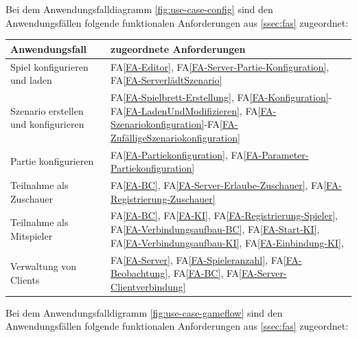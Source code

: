 \documentclass[12pt]{article}
\newcounter{fa}
\newcommand{\mfaref}[1]{FA\ref{#1}}
\begin{document}
Bei dem Anwendungsfalldiagramm \autoref{fig:use-case-config} sind den Anwendungsfällen folgende funktionalen Anforderungen aus \autoref{ssec:fas} zugeordnet: 

\vspace{0.5cm}

\begin{tabularx}{\linewidth}{l|X}
	\textbf{Anwendungsfall} & \textbf{zugeordnete Anforderungen} \\
	\hline
	Spiel konfigurieren und laden & \mfaref{FA-Editor}, \mfaref{FA-Server-Partie-Konfiguration}, \mfaref{FA-ServerlädtSzenario} \\
	Szenario erstellen und konfigurieren & \mfaref{FA-Spielbrett-Erstellung}, \mfaref{FA-Konfiguration}-\mfaref{FA-LadenUndModifizieren}, \mfaref{FA-Szenariokonfiguration}-\mfaref{FA-ZufälligeSzenariokonfiguration} \\
	Partie konfigurieren & \mfaref{FA-Partiekonfiguration}, \mfaref{FA-Parameter-Partiekonfiguration} \\
	Teilnahme als Zuschauer & \mfaref{FA-BC}, \mfaref{FA-Server-Erlaube-Zuschauer}, \mfaref{FA-Registrierung-Zuschauer} \\
	Teilnahme als Mitspieler & \mfaref{FA-BC}, \mfaref{FA-KI}, \mfaref{FA-Registrierung-Spieler}, \mfaref{FA-Verbindungsaufbau-BC}, \mfaref{FA-Start-KI}, \mfaref{FA-Verbindungsaufbau-KI}, \mfaref{FA-Einbindung-KI}, \\
	Verwaltung von Clients & \mfaref{FA-Server}, \mfaref{FA-Spieleranzahl}, \mfaref{FA-Beobachtung}, \mfaref{FA-BC}, \mfaref{FA-Server-Clientverbindung} \\ 
\end{tabularx}

\vspace{0.5cm}

Bei dem Anwendungsfalldigramm \autoref{fig:use-case-gameflow} sind den Anwendungsfällen folgende funktionalen Anforderungen aus \autoref{ssec:fas} zugeordnet: 

\vspace{0.5cm}
\end{document}
